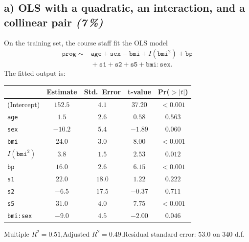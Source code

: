 \documentclass[11pt,a4paper]{article}
\newcommand{\subpoints}[1]{\textit{(#1\,\%)}}
\begin{document}
\subsection*{a) OLS with a quadratic, an interaction, and a collinear pair \subpoints{7}}

On the training set, the course staff fit the OLS model
\begin{align*}
\texttt{prog} \;\sim\;& \texttt{age} + \texttt{sex} + \texttt{bmi} + I(\texttt{bmi}^2) + \texttt{bp} \\
&{}+ \texttt{s1} + \texttt{s2} + \texttt{s5} + \texttt{bmi}\!:\!\texttt{sex}.
\end{align*}
The fitted output is:

\begin{center}\small
\begin{tabular}{lcccc}
\toprule
 & \textbf{Estimate} & \textbf{Std.\ Error} & \textbf{t-value} & \textbf{Pr($>|t|$)} \\
\midrule
(Intercept)            & $152.5$ & $4.1$  & $37.20$ & $<0.001$ \\
\texttt{age}           & $1.5$   & $2.6$  & $0.58$  & $0.563$  \\
\texttt{sex}           & $-10.2$ & $5.4$  & $-1.89$ & $0.060$  \\
\texttt{bmi}           & $24.0$  & $3.0$  & $8.00$  & $<0.001$ \\
$I(\texttt{bmi}^2)$    & $3.8$   & $1.5$  & $2.53$  & $0.012$  \\
\texttt{bp}            & $16.0$  & $2.6$  & $6.15$  & $<0.001$ \\
\texttt{s1}            & $22.0$  & $18.0$ & $1.22$  & $0.222$  \\
\texttt{s2}            & $-6.5$  & $17.5$ & $-0.37$ & $0.711$  \\
\texttt{s5}            & $31.0$  & $4.0$  & $7.75$  & $<0.001$ \\
\texttt{bmi:sex}       & $-9.0$  & $4.5$  & $-2.00$ & $0.046$  \\
\bottomrule
\end{tabular}
\end{center}

\noindent Multiple $R^2 = 0.51$,\quad Adjusted $R^2 = 0.49$.\quad Residual standard error: $53.0$ on $340$ d.f.
\end{document}

